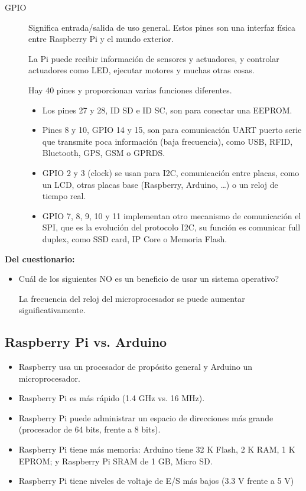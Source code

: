 \documentclass[12pt, twoside, openright]{report} %
\begin{document}
\begin{description}
	\item[GPIO] Significa entrada/salida de uso general. Estos pines son una interfaz física entre Raspberry Pi y el mundo exterior.

	      La Pi puede recibir información de sensores y actuadores, y controlar actuadores como LED, ejecutar motores y muchas otras cosas.

	      Hay 40 pines y proporcionan varias funciones diferentes.
	      \begin{itemize}
		      \item Los pines 27 y 28, ID SD e ID SC, son para conectar una EEPROM.
		      \item Pines 8 y 10, GPIO 14 y 15, son para comunicación UART puerto serie que transmite poca información (baja frecuencia), como USB, RFID, Bluetooth, GPS, GSM o GPRDS.
		      \item GPIO 2 y 3 (clock) se usan para I2C, comunicación entre placas, como un LCD, otras placas base (Raspberry, Arduino, …) o un reloj de tiempo real.
		      \item GPIO 7, 8, 9, 10 y 11 implementan otro mecanismo de comunicación el SPI, que es la evolución del protocolo I2C, su función es comunicar full duplex, como SSD card, IP Core o Memoria Flash.
	      \end{itemize}

\end{description}
\textbf{Del cuestionario:}

\begin{itemize}
	\item Cuál de los siguientes NO es un beneficio de usar un sistema operativo?

	      La frecuencia del reloj del microprocesador se puede aumentar significativamente.
\end{itemize}

\subsection{Raspberry Pi vs. Arduino}
\begin{itemize}
	\item Raspberry usa un procesador de propósito general y Arduino un microprocesador.
	\item Raspberry Pi es más rápido (1.4 GHz vs. 16 MHz).
	\item Raspberry Pi puede administrar un espacio de direcciones más grande (procesador de 64 bits, frente a 8 bits).
	\item Raspberry Pi tiene más memoria: Arduino tiene 32 K Flash, 2 K RAM, 1 K EPROM; y Raspberry Pi SRAM de 1 GB, Micro SD.
	\item Raspberry Pi tiene niveles de voltaje de E/S más bajos (3.3 V frente a 5 V)
\end{itemize}
\end{document}
